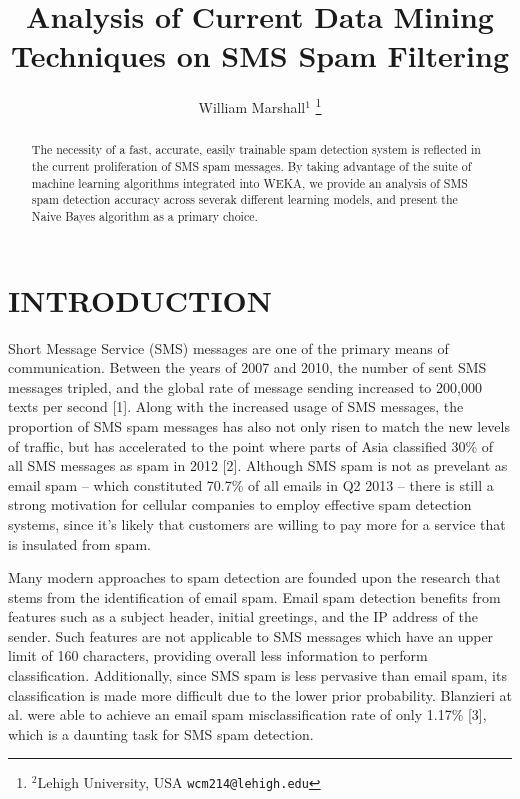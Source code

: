 \documentclass[letterpaper, 10 pt, conference]{ieeeconf}  %
\title{\LARGE \bf
Analysis of Current Data Mining Techniques on SMS Spam Filtering
}
\author{William Marshall$^1$%
\thanks{$^2$Lehigh University, USA {\tt\small wcm214@lehigh.edu}}
}
\begin{document}
\maketitle
\thispagestyle{empty}
\pagestyle{empty}


\begin{abstract}
The necessity of a fast, accurate, easily trainable spam detection
system is reflected in the current proliferation of SMS spam
messages. By taking advantage of the suite of machine learning
algorithms integrated into WEKA, we provide an analysis of SMS spam
detection accuracy across severak different learning models, and
present the Naive Bayes algorithm as a primary choice.
\end{abstract}


\section{INTRODUCTION}
Short Message Service (SMS) messages are one of the primary means of
communication. Between the years of 2007 and 2010, the number of sent
SMS messages tripled, and the global rate of message sending increased
to 200,000 texts per second [1]. Along with the increased usage of SMS
messages, the proportion of SMS spam messages has also not only risen
to match the new levels of traffic, but has accelerated to the point
where parts of Asia classified 30\% of all SMS messages as spam in
2012 [2]. Although SMS spam is not as prevelant as email spam -- which
constituted 70.7\% of all emails in Q2 2013 -- there is still a strong
motivation for cellular companies to employ effective spam detection
systems, since it's likely that customers are willing to pay more for
a service that is insulated from spam.

Many modern approaches to spam detection are founded upon the research
that stems from the identification of email spam. Email spam detection
benefits from features such as a subject header, initial greetings,
and the IP address of the sender. Such features are not applicable to
SMS messages which have an upper limit of 160 characters, providing
overall less information to perform classification. Additionally,
since SMS spam is less pervasive than email spam, its classification
is made more difficult due to the lower prior probability. Blanzieri
at al. were able to achieve an email spam misclassification rate of
only 1.17\% [3], which is a daunting task for SMS spam detection.
\end{document}
